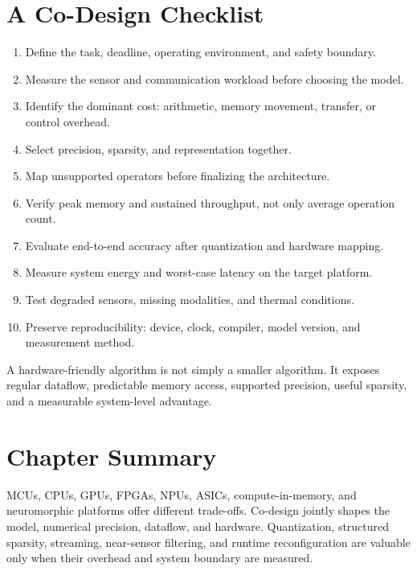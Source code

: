 \section{A Co-Design Checklist}

\begin{enumerate}[label=\arabic*.]
    \item Define the task, deadline, operating environment, and safety boundary.
    \item Measure the sensor and communication workload before choosing the model.
    \item Identify the dominant cost: arithmetic, memory movement, transfer, or control overhead.
    \item Select precision, sparsity, and representation together.
    \item Map unsupported operators before finalizing the architecture.
    \item Verify peak memory and sustained throughput, not only average operation count.
    \item Evaluate end-to-end accuracy after quantization and hardware mapping.
    \item Measure system energy and worst-case latency on the target platform.
    \item Test degraded sensors, missing modalities, and thermal conditions.
    \item Preserve reproducibility: device, clock, compiler, model version, and measurement method.
\end{enumerate}

\begin{keyinsight}
A hardware-friendly algorithm is not simply a smaller algorithm. It exposes regular dataflow, predictable memory access, supported precision, useful sparsity, and a measurable system-level advantage.
\end{keyinsight}

\section{Chapter Summary}

MCUs, CPUs, GPUs, FPGAs, NPUs, ASICs, compute-in-memory, and neuromorphic platforms offer different trade-offs. Co-design jointly shapes the model, numerical precision, dataflow, and hardware. Quantization, structured sparsity, streaming, near-sensor filtering, and runtime reconfiguration are valuable only when their overhead and system boundary are measured.
